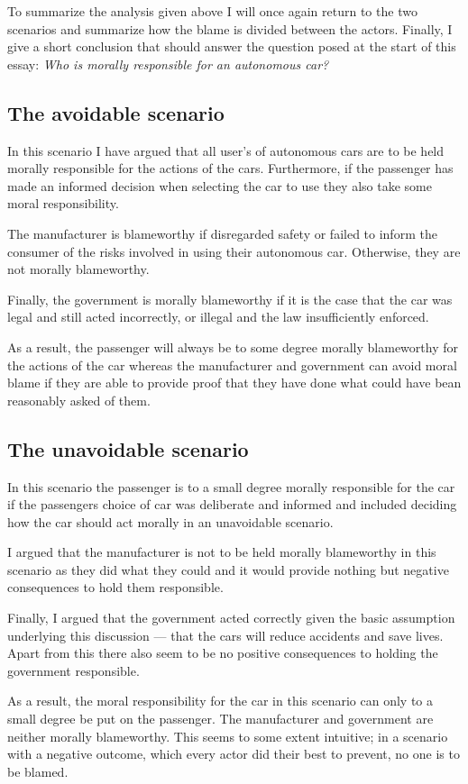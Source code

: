 To summarize the analysis given above I will once again return to the two
scenarios and summarize how the blame is divided between the actors. Finally, I
give a short conclusion that should answer the question posed at the start of
this essay:
\textit{Who is morally responsible for an autonomous car?}

\subsection{The avoidable scenario}
In this scenario I have argued that all user's of autonomous cars are to be held
morally responsible for the actions of the cars. Furthermore, if the passenger
has made an informed decision when selecting the car to use they also take some
moral responsibility.

The manufacturer is blameworthy if disregarded safety or failed to inform the
consumer of the risks involved in using their autonomous car. Otherwise, they
are not morally blameworthy.

Finally, the government is morally blameworthy if it is the case that the car
was legal and still acted incorrectly, or illegal and the law insufficiently
enforced.

As a result, the passenger will always be to some degree morally blameworthy for
the actions of the car whereas the manufacturer and government can avoid moral
blame if they are able to provide proof that they have done what could have bean
reasonably asked of them.

\subsection{The unavoidable scenario}
In this scenario the passenger is to a small degree morally responsible for the
car if the passengers choice of car was deliberate and informed and included
deciding how the car should act morally in an unavoidable scenario.

I argued that the manufacturer is not to be held morally blameworthy in this
scenario as they did what they could and it would provide nothing but negative
consequences to hold them responsible.

Finally, I argued that the government acted correctly given the basic assumption
underlying this discussion --- that the cars will reduce accidents and save
lives. Apart from this there also seem to be no positive consequences to holding
the government responsible.

As a result, the moral responsibility for the car in this scenario can only to a
small degree be put on the passenger. The manufacturer and government are
neither morally blameworthy. This seems to some extent intuitive; in a scenario
with a negative outcome, which every actor did their best to prevent, no one is
to be blamed.

